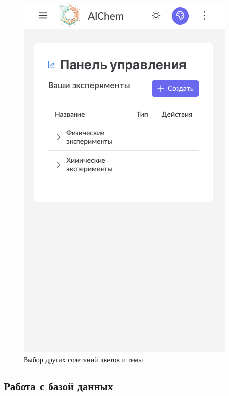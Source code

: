 \begin{figure}[H]
\begin{minipage}{0.45\linewidth}
\includegraphics[width=\linewidth]{img/other_colors.png}
\caption{Выбор других сочетаний цветов и темы}
\label{pic:other_colors}
\end{minipage}
\end{figure}
\vspace{0.5cm}

\subsection{Работа с базой данных}

